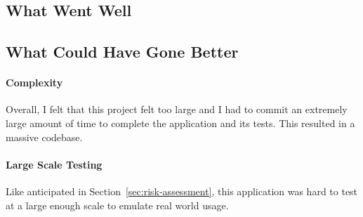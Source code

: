 \subsection*{What Went Well}



\subsection*{What Could Have Gone Better}

\paragraph*{Complexity}
Overall, I felt that this project felt too large and I had to commit an extremely large amount of time to complete the application and its tests. This resulted in a massive codebase.



\paragraph*{Large Scale Testing}
Like anticipated in Section~\ref{sec:risk-assessment}, this application was hard to test at a large enough scale to emulate real world usage.
